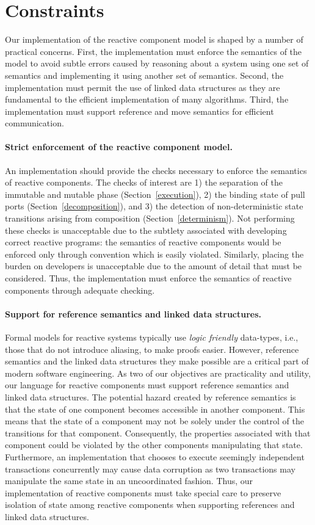 \section{Constraints}

Our implementation of the reactive component model is shaped by a number of practical concerns.
First, the implementation must enforce the semantics of the model to avoid subtle errors caused by reasoning about a system using one set of semantics and implementing it using another set of semantics.
Second, the implementation must permit the use of linked data structures as they are fundamental to the efficient implementation of many algorithms.
Third, the implementation must support reference and move semantics for efficient communication.

\paragraph{Strict enforcement of the reactive component model.}
An implementation should provide the checks necessary to enforce the semantics of reactive components.
The checks of interest are 1) the separation of the immutable and mutable phase (Section~\ref{execution}), 2) the binding state of pull ports (Section~\ref{decomposition}), and 3) the detection of non-deterministic state transitions arising from composition (Section~\ref{determinism}).
Not performing these checks is unacceptable due to the subtlety associated with developing correct reactive programs:  the semantics of reactive components would be enforced only through convention which is easily violated.
Similarly, placing the burden on developers is unacceptable due to the amount of detail that must be considered.
Thus, the implementation must enforce the semantics of reactive components through adequate checking.

\paragraph{Support for reference semantics and linked data structures.}
Formal models for reactive systems typically use \emph{logic friendly} data-types, i.e., those that do not introduce aliasing, to make proofs easier.
However, reference semantics and the linked data structures they make possible are a critical part of modern software engineering.
As two of our objectives are practicality and utility, our language for reactive components must support reference semantics and linked data structures.
The potential hazard created by reference semantics is that the state of one component becomes accessible in another component.
This means that the state of a component may not be solely under the control of the transitions for that component.
Consequently, the properties associated with that component could be violated by the other components manipulating that state.
Furthermore, an implementation that chooses to execute seemingly independent transactions concurrently may cause data corruption as two transactions may manipulate the same state in an uncoordinated fashion.
Thus, our implementation of reactive components must take special care to preserve isolation of state among reactive components when supporting references and linked data structures.

